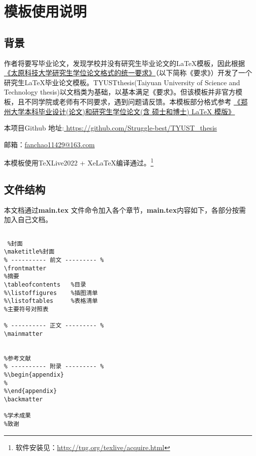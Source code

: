 \linespread{1.55}\selectfont
\chapter{模板使用说明}
\section{背景}
作者将要写毕业论文，发现学校并没有研究生毕业论文的\LaTeX 模板，因此根据\href{https://yjsxy.tyust.edu.cn/info/1172/3275.html}{《太原科技大学研究生学位论文格式的统一要求》}（以下简称《要求》）开发了一个研究生\LaTeX 毕业论文模板。TYUSTthesis(Taiyuan University of Science and Technology thesis)以文档类为基础，以基本满足《要求》。但该模板并非官方模板，且不同学院或老师有不同要求，遇到问题请反馈。本模板部分格式参考
\href{https://github.com/tuxify/zzuthesis}{《郑州大学本科毕业设计(论文)和研究生学位论文(含 硕士和博士) LaTeX 模版》}

本项目Github 地址\faGithub :\href{https://github.com/Struggle-best/TYUST_thesis}{ \;\;https://github.com/Struggle-best/TYUST\_thesis}

邮箱：\href{fanchao11429@163.com}{fanchao11429@163.com}

本模板使用\TeX Live2022 + Xe\LaTeX 编译通过。\footnote{软件安装见：\url{http://tug.org/texlive/acquire.html}}
\section{文件结构}
本文档通过\textbf{main.tex} 文件\myverb{}命令加入各个章节，\textbf{main.tex}内容如下，各部分按需加入自己文档。

\begin{lstlisting}

 %封面
\maketitle%封面
% ---------- 前文 --------- %
\frontmatter
%摘要
\tableofcontents   %目录
%\listoffigures    %插图清单
%\listoftables     %表格清单
%主要符号对照表

% ---------- 正文 --------- %
\mainmatter


%参考文献
% ---------- 附录 --------- %
%\begin{appendix}
%	
%\end{appendix}
\backmatter

%学术成果
%致谢

\end{lstlisting}
